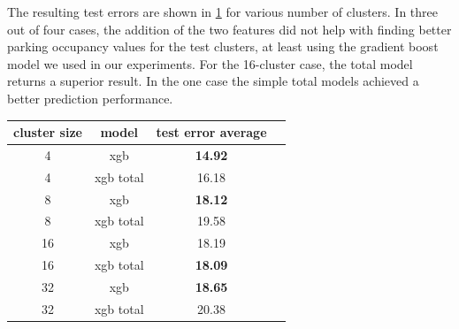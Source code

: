 \documentclass{ws-ijait}
\begin{document}
		The resulting test errors are shown in \cref{tab:extended_models_comparison} for various number of clusters. In three out of four cases, the addition of the two features did not help with finding better parking occupancy values for the test clusters, at least using the gradient boost model we used in our experiments. For the 16-cluster case, the total model returns a superior result. In the one case the simple total models achieved a better prediction performance. 
		
		\begin{table}[!ht]
			{\begin{tabular}{ | c | c | c | c | }
					\hline		
					\textbf{cluster size}  & \textbf{model} & \textbf{test error average} \\ \hline
					4 & {xgb} & \textbf{14.92} \\ \hline
					4 & {xgb total} & 16.18 \\ \hline \hline
					8 & {xgb} & \textbf{18.12} \\ \hline
					8 & {xgb total} & 19.58 \\ \hline \hline
					16 & {xgb} & 18.19 \\ \hline
					16 & {xgb total} & \textbf{18.09} \\ \hline \hline
					32 & {xgb} & \textbf{18.65} \\ \hline
					32 & {xgb total} & 20.38 \\ \hline
			\end{tabular}}
			\label{tab:extended_models_comparison}
		\end{table}
			
\end{document}
